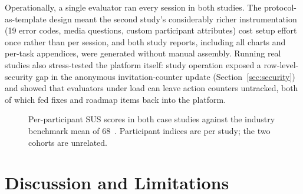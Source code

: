 \documentclass[conference]{IEEEtran}
\begin{document}
Operationally, a single evaluator ran every session in both studies. The
protocol-as-template design meant the second study's considerably richer
instrumentation (19 error codes, media questions, custom participant
attributes) cost setup effort once rather than per session, and both
study reports, including all charts and per-task appendices, were
generated without manual assembly. Running real studies also stress-tested
the platform itself: study operation exposed a row-level-security gap in
the anonymous invitation-counter update (Section~\ref{sec:security}) and showed that
evaluators under load can leave action counters untracked, both of which
fed fixes and roadmap items back into the platform.

\begin{figure}[t]
\centering
{}
\caption{Per-participant SUS scores in both case studies against the
industry benchmark mean of 68~\cite{sauro2011practical}. Participant
indices are per study; the two cohorts are unrelated.}
\label{fig:sus}
\end{figure}

\section{Discussion and Limitations}
\end{document}
